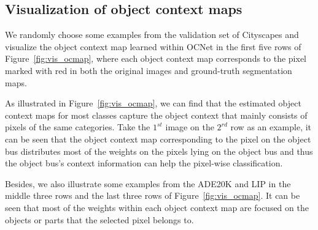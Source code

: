 \documentclass[10pt,twocolumn,letterpaper]{article}
\begin{document}
\subsection{Visualization of object context maps}
We randomly choose some examples from the validation set of Cityscapes 
and visualize the object context map learned within OCNet in
the first five rows of Figure~\ref{fig:vis_ocmap}, 
where each object context map corresponds to the pixel marked with red {} 
in both the original images and ground-truth segmentation maps.

As illustrated in Figure~\ref{fig:vis_ocmap}, 
we can find that the estimated object context maps 
for most classes capture the object context
that mainly consists of pixels of the same categories. 
Take the $1^{st}$ image on the $2^{rd}$ row as an example, it can be seen that
the object context map corresponding to the pixel on the object bus
distributes most of the weights on the pixels lying 
on the object bus and thus the object bus's context information
can help the pixel-wise classification.

Besides, we also illustrate some examples from the ADE20K and LIP 
in the middle three rows and the last three rows of Figure~\ref{fig:vis_ocmap}.
It can be seen that most of the weights within each object context map are focused on the
objects or parts that the selected pixel belongs to.


\end{document}
